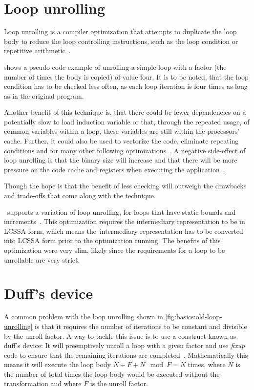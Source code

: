 

\section{Loop unrolling}\label{sec:basics:unrolling}

Loop unrolling is a compiler optimization that attempts to duplicate the loop body to reduce the loop controlling instructions, such as the loop condition or repetitive arithmetic~\cite{aho_ullman_1979}.

 shows a pseudo code example of unrolling a simple loop with a factor (the number of times the body is copied) of value four.
It is to be noted, that the loop condition has to be checked less often, as each loop iteration is four times as long as in the original program.

Another benefit of this technique is, that there could be fewer dependencies on a potentially slow to load induction variable or that, through the repeated usage, of common variables within a loop, these variables are still within the processors' cache.
Further, it could also be used to vectorize the code, eliminate repeating conditions and for many other following optimizations~\cite{fog_2018}.
A negative side-effect of loop unrolling is that the binary size will increase and that there will be more pressure on the code cache and registers when executing the application~\cite{Sarkar2001}.

Though the hope is that the benefit of less checking will outweigh the drawbacks and trade-offs that come along with the technique.

\libFIRM~supports a variation of loop unrolling, for loops that have static bounds and increments~\cite{aebi18bachelorarbeit}.
This optimization requires the intermediary representation to be in LCSSA form, which means the~\libFIRM intermediary representation has to be converted into LCSSA form prior to the optimization running\cite{aebi18bachelorarbeit}.
The benefits of this optimization were very slim, likely since the requirements for a loop to be unrollable are very strict.




\section{Duff's device}\label{sec:basics:duffs}

A common problem with the loop unrolling shown in \cref{fig:basics:old-loop-unrolling} is that it requires the number of iterations to be constant and divisible by the unroll factor.
A way to tackle this issue is to use a construct known as duff's device: It will preemptively unroll a loop with a given factor and use \textit{fixup} code to ensure that the remaining iterations are completed~\cite{duff_1983}.
Mathematically this means it will execute the loop body $N \div F + N \mod F = N$ times, where $N$ is the number of total times the loop body would be executed without the transformation and where $F$ is the unroll factor.

